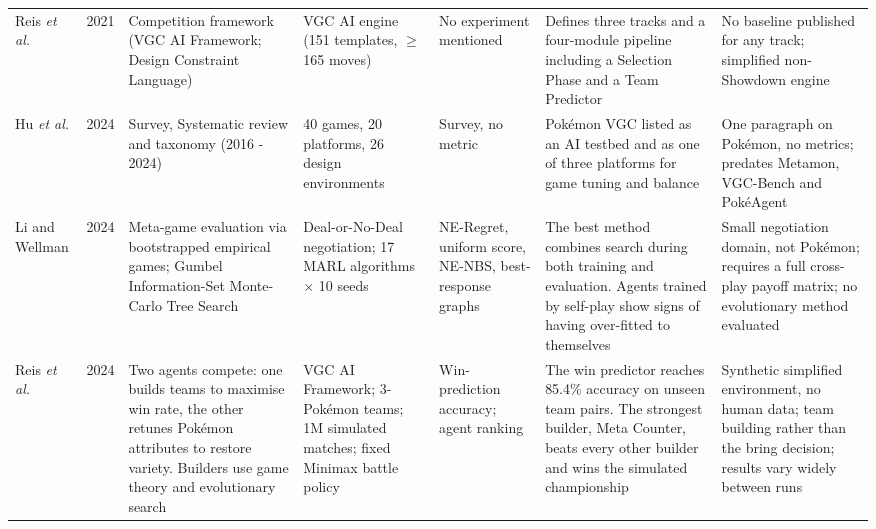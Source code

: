 \documentclass[conference]{IEEEtran}
\begin{document}
\begin{table}[!t]
\begin{tabular}{@{}p{1.4cm}p{0.5cm}p{3.0cm}p{2.8cm}p{2.0cm}p{3.5cm}p{3.3cm}@{}}
Reis \emph{et al.} \cite{reis2021} & 2021 &
Competition framework (VGC AI Framework; Design Constraint Language) &
VGC AI engine (151 templates, $\geq$165 moves) &
No experiment mentioned &
Defines three tracks and a four-module pipeline including a Selection Phase and a Team Predictor &
No baseline published for any track; simplified non-Showdown engine \\
\addlinespace

Hu \emph{et al.} \cite{hu2024} & 2024 &
Survey, Systematic review and taxonomy (2016 - 2024) &
40 games, 20 platforms, 26 design environments &
Survey, no metric &
Pok\'emon VGC listed as an AI testbed and as one of three platforms for game tuning and balance &
One paragraph on Pok\'emon, no metrics; predates Metamon, VGC-Bench and Pok\'eAgent \\
\addlinespace

Li and Wellman \cite{liwellman2024} & 2024 &
Meta-game evaluation via bootstrapped empirical games; Gumbel Information-Set Monte-Carlo Tree Search &
Deal-or-No-Deal negotiation; 17 MARL algorithms $\times$ 10 seeds &
NE-Regret, uniform score, NE-NBS, best-response graphs & The best method combines search during both training and evaluation. Agents trained by self-play show signs of having over-fitted to themselves &
Small negotiation domain, not Pok\'emon; requires a full cross-play payoff matrix; no evolutionary method evaluated \\
\addlinespace

Reis \emph{et al.} \cite{reis2024} & 2024 &
Two agents compete: one builds teams to maximise win rate, the other retunes Pok\'emon attributes to restore variety. Builders use game theory and evolutionary search &
VGC AI Framework; 3-Pok\'emon teams; 1M simulated matches; fixed Minimax battle policy &
Win-prediction accuracy; agent ranking &
The win predictor reaches 85.4\% accuracy on unseen team pairs. The strongest builder, Meta Counter, beats every other builder and wins the simulated championship &
Synthetic simplified environment, no human data; team building rather than the bring decision; results vary widely between runs \\
\bottomrule
\end{tabular}
\end{table}
\end{document}
